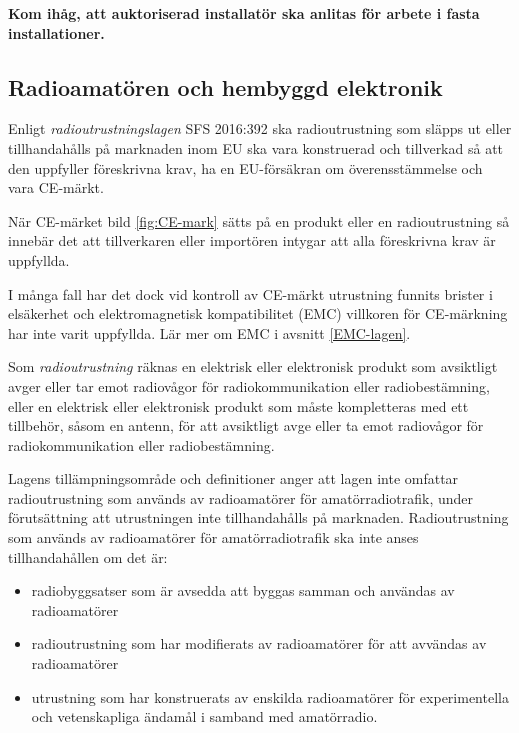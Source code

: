 \noindent\textbf{Kom ihåg, att auktoriserad installatör ska anlitas för arbete
i fasta installationer.}


\subsection{Radioamatören och hembyggd elektronik}

Enligt \emph{radioutrustningslagen} SFS 2016:392 \cite{SFS2016:392} ska
radioutrustning som släpps ut eller tillhandahålls på marknaden inom EU ska vara
konstruerad och tillverkad så att den uppfyller föreskrivna krav, ha en
EU-försäkran om överensstämmelse och vara CE-märkt.

När CE-märket bild \ref{fig:CE-mark} sätts på en produkt eller en
radioutrustning så innebär det att tillverkaren eller importören intygar att
alla föreskrivna krav är uppfyllda.

I många fall har det dock vid kontroll av CE-märkt utrustning funnits brister
i elsäkerhet och elektromagnetisk kompatibilitet (EMC) villkoren för CE-märkning
har inte varit uppfyllda. Lär mer om EMC i avsnitt \ref{EMC-lagen}.

Som \emph{radioutrustning} räknas en elektrisk eller elektronisk produkt som
avsiktligt avger eller tar emot radiovågor för radiokommunikation eller
radiobestämning, eller en elektrisk eller elektronisk produkt som måste
kompletteras med ett tillbehör, såsom en antenn, för att avsiktligt avge
eller ta emot radiovågor för radiokommunikation eller radiobestämning.

Lagens tillämpningsområde och definitioner anger att lagen inte omfattar
radioutrustning som används av radioamatörer för amatörradiotrafik, under
förutsättning att utrustningen inte tillhandahålls på marknaden.
Radioutrustning som används av radioamatörer för amatörradiotrafik ska inte
anses tillhandahållen om det är:

\begin{itemize}
  \item radiobyggsatser som är avsedda att byggas samman och användas av
  radioamatörer
  \item radioutrustning som har modifierats av radioamatörer för att
  avvändas av radioamatörer
  \item utrustning som har konstruerats av enskilda radioamatörer för
  experimentella och vetenskapliga ändamål i samband med amatörradio.
\end{itemize}

